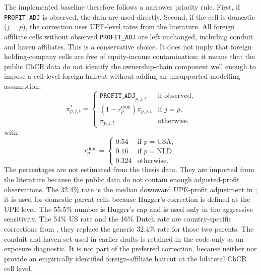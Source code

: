 \documentclass[11pt,a4paper]{article}
\newcommand{\code}[1]{\texttt{#1}}
\begin{document}
The implemented baseline therefore follows a narrower priority rule. First, if \code{PROFIT\_ADJ} is observed, the data are used directly. Second, if the cell is domestic ($j=p$), the correction uses UPE-level rates from the literature. All foreign affiliate cells without observed \code{PROFIT\_ADJ} are left unchanged, including conduit and haven affiliates. This is a conservative choice. It does not imply that foreign holding-company cells are free of equity-income contamination; it means that the public CbCR data do not identify the ownership-chain component well enough to impose a cell-level foreign haircut without adding an unsupported modelling assumption.
\begin{equation}\label{eq:profit_correction}
\pi_{p,j,t}^{*} =
\begin{cases}
\code{PROFIT\_ADJ}_{p,j,t} & \text{if observed}, \\[4pt]
\left(1-r_{p}^{\text{dom}}\right)\pi_{p,j,t} & \text{if } j=p, \\[4pt]
\pi_{p,j,t} & \text{otherwise,}
\end{cases}
\end{equation}
with
\begin{equation}\label{eq:profit_correction_domestic}
r_{p}^{\text{dom}} =
\begin{cases}
0.54 & \text{if } p=\text{USA}, \\[2pt]
0.16 & \text{if } p=\text{NLD}, \\[2pt]
0.324 & \text{otherwise.}
\end{cases}
\end{equation}
The percentages are not estimated from the thesis data. They are imported from the literature because the public data do not contain enough adjusted-profit observations. The 32.4\% rate is the median downward UPE-profit adjustment in \citet{hugger2026}; it is used for domestic parent cells because Hugger's correction is defined at the UPE level. The 55.5\% number is Hugger's cap and is used only in the aggressive sensitivity. The 54\% US rate and the 16\% Dutch rate are country-specific corrections from \citet{garcia-bernardo2022a}; they replace the generic 32.4\% rate for those two parents. The conduit and haven set used in earlier drafts is retained in the code only as an exposure diagnostic. It is not part of the preferred correction, because neither \citet{blouin2023} nor \citet{hugger2026} provide an empirically identified foreign-affiliate haircut at the bilateral CbCR cell level.
\end{document}
